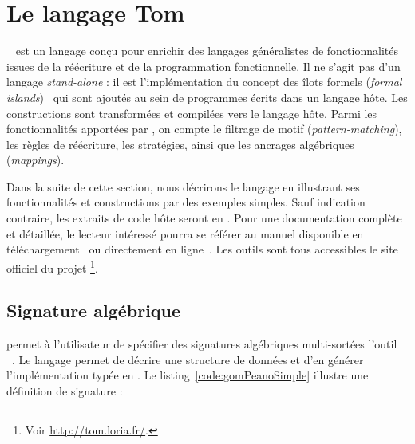 \section{Le langage Tom}


{\tom}~\cite{Moreau2003,Balland2007} est un langage conçu pour enrichir des
langages généralistes de fonctionnalités issues de la réécriture et de la
programmation fonctionnelle. Il ne s'agit pas d'un langage \emph{stand-alone} :
il est l'implémentation du concept des \og îlots formels \fg (\emph{formal
islands})~\cite{Balland2006} qui sont ajoutés au sein de programmes écrits dans
un langage hôte. Les constructions {\tom} sont transformées et compilées vers
le langage hôte. Parmi les fonctionnalités apportées par {\tom}, on compte le
filtrage de motif (\emph{pattern-matching}), les règles de réécriture, les
stratégies, ainsi que les ancrages algébriques (\emph{mappings}). 



Dans la suite de cette section, nous décrirons le langage {\tom} en illustrant
ses fonctionnalités et constructions par des exemples simples. Sauf indication
contraire, les extraits de code hôte seront en {\java}. Pour une documentation
complète et détaillée, le lecteur intéressé pourra se référer au manuel
disponible en téléchargement~\cite{Bach2009} ou directement en
ligne~\cite{TomManual-2.10}. Les outils sont tous accessibles {\via} le site
officiel du projet {\tom}\footnote{Voir \url{http://tom.loria.fr/}.}.


\subsection{Signature algébrique}
\label{subsec:signalg}
{\tom} permet à l'utilisateur de spécifier des signatures algébriques
multi-sortées {\via} l'outil {\gom}~\cite{Reilles2007}. Le langage
{\gom}\index{\gom} permet de décrire une structure de données et d'en générer
l'implémentation typée en {\java}. Le listing~\ref{code:gomPeanoSimple}
illustre une définition de signature {\gom} :



